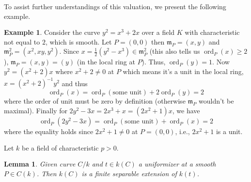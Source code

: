 \documentclass[12pt]{article}
\newtheorem{lemma}{Lemma}[subsection]
\theoremstyle{remark}
\theoremstyle{definition}
\newtheorem{example}{Example}[subsection]
\newcommand{\ord}[0]{\operatorname{ord}}
\begin{document}
        \noindent To assist further understandings of this valuation, we present the following example.
        \begin{example}
            Consider the curve $y^2=x^3+2x$ over a field $K$ with characteristic not equal to $2$, which is smooth. Let $P=(0, 0)$ then $\mathfrak m_P=(x, y)$ and $\mathfrak m_P^2=(x^2,xy,y^2)$. Since $x=\frac{1}{2}(y^2-x^3)\in\mathfrak m_P^2$ (this also tells us $\ord_P(x)\geqslant 2$), $\mathfrak m_P=(x, y)=(y)$ (in the local ring at $P$). Thus, $\ord_P(y)=1$. Now $y^2=(x^2+2)x$ where $x^2+2\neq 0$ at $P$ which means it's a unit in the local ring, $x=(x^2+2)^{-1}y^2$ and thus
            \[\ord_P(x)=\ord_P(\text{some unit})+2\ord_P(y)=2\]
            where the order of unit must be zero by definition (otherwise $\mathfrak m_P$ wouldn't be maximal). Finally for $2y^2-3x=2x^3+x=(2x^2+1)x$, we have
            \[\ord_P(2y^2-3x)=\ord_P(\text{some unit})+\ord_P(x)=2\]
            where the equality holds since $2x^2+1\neq 0$ at $P=(0, 0)$, i.e., $2x^2+1$ is a unit.
        \end{example}
        Let $k$ be a field of characteristic $p>0$.
        \begin{lemma}\label{lemma-unif-sep}
            Given curve $C/k$ and $t\in k(C)$ a uniformizer at a smooth $P\in C(k)$. Then $k(C)$ is a finite separable extension of $k(t)$.
        \end{lemma}
\end{document}
